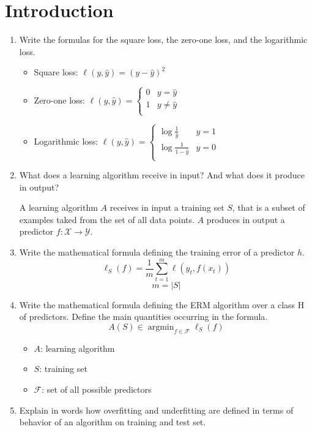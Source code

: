 \documentclass[a4paper]{article}
\newcommand{\Y}{\ensuremath{\mathcal{Y}}}
\newcommand{\X}{\ensuremath{\mathcal{X}}}
\newcommand{\F}{\ensuremath{\mathcal{F}}}
\DeclareMathOperator*{\argmin}{argmin}
\begin{document}
\section{Introduction}

\begin{enumerate}
    \item Write the formulas for the square loss, the zero-one loss, and the logarithmic loss.
        \begin{itemize}
            \item Square loss: $\ell(y,\hat{y}) = (y-\hat{y})^2$
            \item Zero-one loss: $\ell(y,\hat{y}) = \begin{cases}
                    0 & y=\hat{y}\\
                    1 & y\neq\hat{y}\\
                \end{cases}$
            \item Logarithmic loss: $\ell(y,\hat{y}) = \begin{cases}
                    \log{\frac{1}{\hat{y}}} & y=1\\
                    \log{\frac{1}{1-\hat{y}}} & y=0\\
                \end{cases}$
        \end{itemize}
    \item What does a learning algorithm receive in input? And what does it produce in output?
        
        A learning algorithm $A$ receives in input a training set $S$, that is a subset of examples taked 
        from the set of all data points. $A$ produces in output a predictor $f:\X\to\Y$.    
    \item Write the mathematical formula defining the training error of a predictor $h$.
        $$ \ell_S(f) = \frac{1}{m}\sum_{t=1}^m \ell(y_t,f(x_t)) $$
        $$ m = |S| $$
    \item Write the mathematical formula defining the ERM algorithm over a class H of predictors.
    Define the main quantities occurring in the formula.
    $$ A(S) \in \argmin_{f\in\F} \ell_S(f) $$
        \begin{itemize}
            \item $A$: learning algorithm
            \item $S$: training set 
            \item $\F$: set of all possible predictors
        \end{itemize}
    \item Explain in words how overfitting and underfitting are defined in terms of behavior of an
    algorithm on training and test set.


\end{enumerate}
\end{document}
